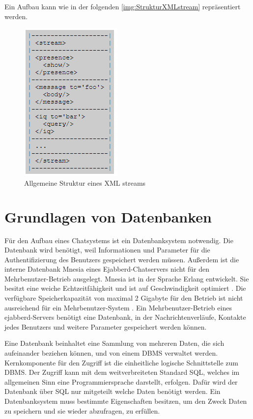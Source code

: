 \documentclass[a4paper,titlepage,halfparskip,12pt]{scrreprt}
\begin{document}
\begin{onehalfspacing}
\pagebreak

Ein Aufbau kann wie in der folgenden \autoref{img:StrukturXMLstream} repräsentiert werden. \cite{RFC6120Sec4}
\begin{figure}[h]
	\centering
	\includegraphics[scale=1.2]{images/XML_Stream}
	\caption{Allgemeine Struktur eines XML streams}
	\label{img:StrukturXMLstream}
\end{figure}

\pagebreak

\section{Grundlagen von Datenbanken}
\label{sec:Datenbank}
Für den Aufbau eines Chatsystems ist ein Datenbanksystem notwendig. Die Datenbank wird benötigt, weil Informationen und Parameter für die Authentifizierung des Benutzers gespeichert werden müssen. Außerdem ist die interne Datenbank Mnesia eines Ejabberd-Chatservers nicht für den Mehrbenutzer-Betrieb ausgelegt. Mnesia ist in der Sprache Erlang entwickelt. Sie besitzt eine weiche Echtzeitfähigkeit und ist auf Geschwindigkeit optimiert \cite{MnesiaDoc}. Die verfügbare Speicherkapazität von maximal 2 Gigabyte für den Betrieb ist nicht ausreichend für ein Mehrbenutzer-System \cite{ejabberdDoc}. Ein Mehrbenutzer-Betrieb eines ejabberd-Servers benötigt eine Datenbank, in der Nachrichtenverläufe, Kontakte jedes Benutzers und weitere Parameter gespeichert werden können.

Eine Datenbank beinhaltet eine Sammlung von mehreren Daten, die sich aufeinander beziehen können, und von einem \ac{DBMS} verwaltet werden. Kernkomponente für den Zugriff ist die einheitliche logische Schnittstelle zum \ac{DBMS}. Der Zugriff kann mit dem weitverbreiteten Standard \ac{SQL}, welches im allgemeinen Sinn eine Programmiersprache darstellt, erfolgen. Dafür wird der Datenbank über \ac{SQL} nur mitgeteilt welche Daten benötigt werden. Ein Datenbanksystem muss bestimmte Eigenschaften besitzen, um den Zweck Daten zu speichern und sie wieder abzufragen, zu erfüllen.


\end{onehalfspacing}
\end{document}
